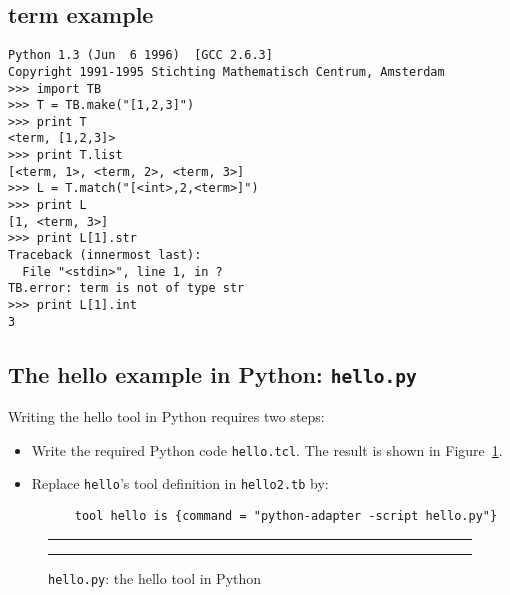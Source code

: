 \subsection{term example}
\begin{verbatim}
Python 1.3 (Jun  6 1996)  [GCC 2.6.3]
Copyright 1991-1995 Stichting Mathematisch Centrum, Amsterdam
>>> import TB
>>> T = TB.make("[1,2,3]")
>>> print T
<term, [1,2,3]>
>>> print T.list
[<term, 1>, <term, 2>, <term, 3>]
>>> L = T.match("[<int>,2,<term>]")
>>> print L
[1, <term, 3>]
>>> print L[1].str
Traceback (innermost last):
  File "<stdin>", line 1, in ?
TB.error: term is not of type str
>>> print L[1].int
3
\end{verbatim}

\subsection{\label{Ex-hello.py}The hello example in Python: {\tt hello.py}}

Writing the hello tool in Python requires two steps:
\begin{itemize}
\item Write the required Python code {\tt hello.tcl}. 
      The result is shown in Figure~\ref{fig:hello.py}.
\item Replace {\tt hello}'s tool definition in {\tt hello2.tb} by:
\begin{verbatim}
      tool hello is {command = "python-adapter -script hello.py"}
\end{verbatim}
\end{itemize}


\begin{figure}
\rule{\textwidth}{0.5mm}

  \caption{{\tt hello.py}: the hello tool in Python}
  \label{fig:hello.py}
\rule{\textwidth}{0.5mm}
\end{figure}
